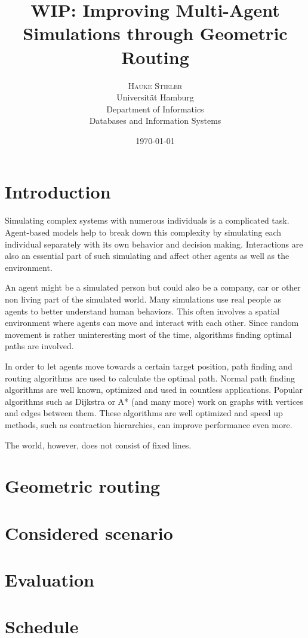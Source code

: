 \documentclass[
	a4paper,
	11pt,
	twoside,
	twocolumn
]{article}
\title{WIP: Improving Multi-Agent Simulations through Geometric Routing}
\author{%
	\textsc{Hauke Stieler} \\[1ex]
	\normalsize Universit\"at Hamburg \\ 
	\normalsize Department of Informatics \\
	\normalsize Databases and Information Systems \\
}
\date{\today}
\begin{document}
	\maketitle
	
	\section{Introduction}
		
		
		Simulating complex systems with numerous individuals is a complicated task.
		Agent-based models help to break down this complexity by simulating each individual separately with its own behavior and decision making. \cite{macal2014introductory}
		Interactions are also an essential part of such simulating and affect other agents as well as the environment.
		
		An agent might be a simulated person but could also be a company, car or other non living part of the simulated world.
		Many simulations use real people as agents to better understand human behaviors.
		This often involves a spatial environment where agents can move and interact with each other.
		Since random movement is rather uninteresting most of the time, algorithms finding optimal paths are involved. 
		
		In order to let agents move towards a certain target position, path finding and routing algorithms are used to calculate the optimal path.
		Normal path finding algorithms are well known, optimized and used in countless applications.
		Popular algorithms such as Dijkstra or A* (and many more) work on graphs with vertices and edges between them.
		These algorithms are well optimized and speed up methods, such as contraction hierarchies, can improve performance even more.

		The world, however, does not consist of fixed lines.
		
		
		
	\section{Geometric routing}
	
		
		
		
	\section{Considered scenario}
	
		
	\section{Evaluation}
	
		
	
	\section{Schedule}
	
	
	\printbibliography
\end{document}
